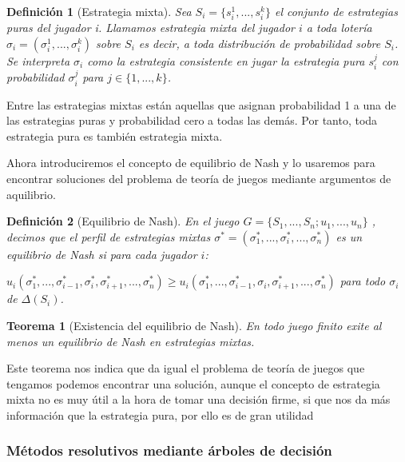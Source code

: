\documentclass[a4paper]{report} %
\newtheorem{definicion}{Definición}[section]
\newtheorem{teorem}{Teorema}[section]
\begin{document}
\begin{definicion}[Estrategia mixta]

Sea $S_i=\lbrace s_i^1,...,s_i^k\rbrace$ el conjunto de estrategias puras del jugador i. Llamamos estrategia mixta del jugador $i$ a toda lotería $\sigma_i=(\sigma_i^1,...,\sigma_i^k)$ sobre $S_i$ es decir, a toda distribución de probabilidad sobre $S_i$. Se interpreta $\sigma_i$ como la estrategia consistente en jugar la estrategia pura $s_i^j$ con probabilidad $\sigma_i^j$ para $j \in \lbrace 1,...,k \rbrace $.
\end{definicion}

Entre las estrategias mixtas están aquellas que asignan probabilidad 1 a una de las estrategias puras y probabilidad cero a todas las demás. Por tanto, toda estrategia pura es también estrategia mixta.

Ahora introduciremos el concepto de equilibrio de Nash y lo usaremos para encontrar soluciones del problema de teoría de juegos mediante argumentos de aquilibrio.

\begin{definicion}[Equilibrio de Nash]

En el juego  $G=\lbrace S_1, ..., S_n; u_1, ..., u_n\rbrace$ , decimos que el perfil de estrategias mixtas $\sigma ^* =(\sigma _1^*,...,\sigma _i^*,...,\sigma _n^*)$ es un equilibrio de Nash si para cada jugador $i$:

$
u_i(\sigma _1^*,...,\sigma _{i-1}^*,\sigma _i^*,\sigma _{i+1}^*,...,\sigma _n^*)\geq u_i(\sigma _1^*,...,\sigma _{i-1}^*,\sigma _i,\sigma _{i+1}^*,...,\sigma _n^*) 
$ para todo $\sigma _i$ de $\Delta (S_i)$.

\end{definicion}




\begin{teorem}[Existencia del equilibrio de Nash]
En todo juego finito exite al menos un equilibrio de Nash en estrategias mixtas.
\end{teorem}

Este teorema nos indica que da igual el problema de teoría de juegos que tengamos podemos encontrar una solución, aunque el concepto de estrategia mixta no es muy útil a la hora de tomar una decisión firme, si que nos da más información que la estrategia pura, por ello es de gran utilidad 

\subsubsection{Métodos resolutivos mediante árboles de decisión}
\end{document}
